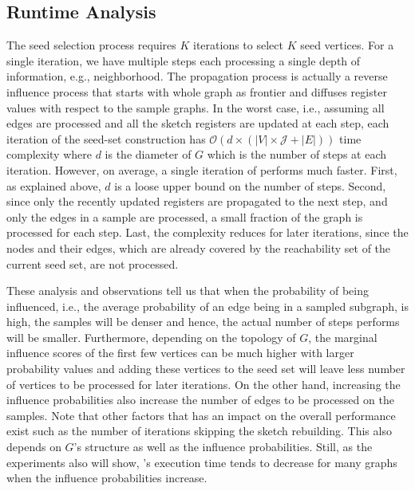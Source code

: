\documentclass[review]{elsarticle}
\newcommand\acro{{\sc{HyperFuseR\xspace}\xspace}\xspace}
\begin{document}
\subsection{Runtime Analysis}\label{sec:runtime}

The seed selection process requires $K$ iterations to select $K$ seed vertices. For a single iteration, we have multiple steps each processing a single depth of information, e.g., neighborhood. The propagation process is actually a reverse influence process that starts with whole graph as frontier and diffuses register values with respect to the sample graphs. In the worst case, i.e., assuming all edges are processed and all the sketch registers are updated at each step, each iteration of the seed-set construction has ${\mathcal O}(d \times (|V|\times \mathcal{J} + |E|))$ time complexity where $d$ is the diameter of $G$ which is the number of steps at each iteration. However, on average, a single iteration of \acro performs much faster. First, as explained above, $d$ is a loose upper bound on the number of steps. Second, since only the recently updated registers are propagated to the next step, and only the edges in a sample are processed, a small fraction of the graph is processed for each step. Last, the complexity reduces for later iterations, since the nodes and their edges, which are already covered by the reachability set of the current seed set, are not processed. 

These analysis and observations tell us that when the probability of being influenced, i.e., the average probability of an edge being in a sampled subgraph, is high, the samples will be denser and hence, the actual number of steps \acro performs will be smaller. Furthermore, depending on the topology of $G$, the marginal influence scores of the first few vertices can be much higher with larger probability values and adding these vertices to the seed set will leave less number of vertices to be processed for later iterations. On the other hand, increasing the influence probabilities also increase the number of edges to be processed on the samples. Note that other factors that has an impact on the overall performance exist such as the number of iterations skipping the sketch rebuilding. This also depends on $G$'s structure as well as the influence probabilities. Still, as the experiments also will show, \acro's execution time tends to decrease for many graphs when the influence probabilities increase.

%  


\end{document}
